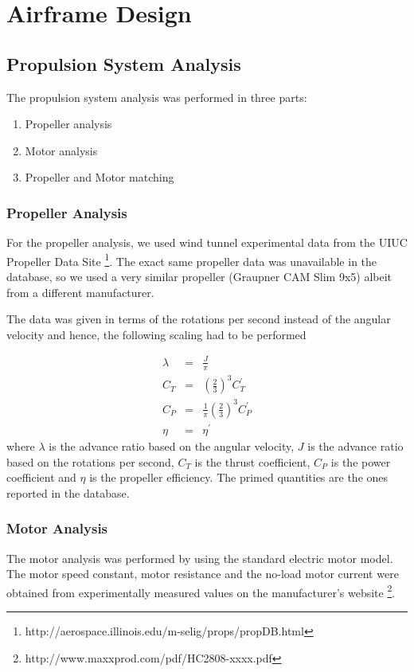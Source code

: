 \documentclass[11pt]{article}
\begin{document}


\section{Airframe Design}
\label{Vehicle}

\subsection{Propulsion System Analysis}

The propulsion system analysis was performed in three parts:
\begin{enumerate}
\item Propeller analysis
\item Motor analysis
\item Propeller and Motor matching
\end{enumerate}

\subsubsection{Propeller Analysis}

For the propeller analysis, we used wind tunnel experimental data from the UIUC Propeller Data Site \footnote{http://aerospace.illinois.edu/m-selig/props/propDB.html}. The exact same propeller data was unavailable in the database, so we used a very similar propeller (Graupner CAM Slim 9x5) albeit from a different manufacturer.

The data was given in terms of the rotations per second instead of the angular velocity and hence, the following scaling had to be performed

\begin{eqnarray*}
\lambda &=& \frac{J}{\pi} \\
C_T &=& \left( \frac{2}{3} \right)^3 C_T ^ \prime \\
C_P &=& \frac{1}{\pi} \left( \frac{2}{3} \right)^3 C_P ^ \prime \\
\eta &=& \eta ^ \prime
\end{eqnarray*}
where $\lambda$ is the advance ratio based on the angular velocity, $J$ is the advance ratio based on the rotations per second, $C_T$ is the thrust coefficient, $C_P$ is the power coefficient and $\eta$ is the propeller efficiency. The primed quantities are the ones reported in the database.

\subsubsection{Motor Analysis}
The motor analysis was performed by using the standard electric motor model. The motor speed constant, motor resistance and the no-load motor current were obtained from experimentally measured values on the manufacturer's website \footnote{http://www.maxxprod.com/pdf/HC2808-xxxx.pdf}.
\end{document}
